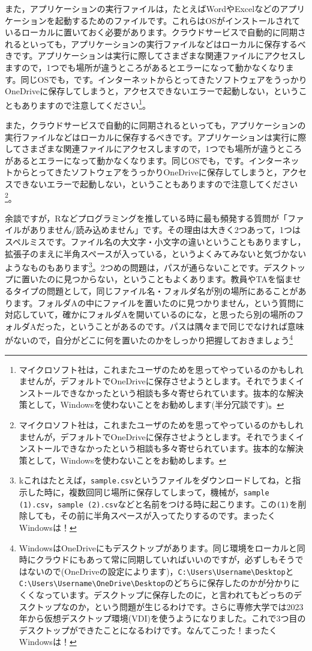 \documentclass{ltjsbook}
\begin{document}
また，アプリケーションの実行ファイルは，たとえばWordやExcelなどのアプリケーションを起動するためのファイルです。これらはOSがインストールされているローカルに置いておく必要があります。クラウドサービスで自動的に同期されるといっても，アプリケーションの実行ファイルなどはローカルに保存するべきです。アプリケーションは実行に際してさまざまな関連ファイルにアクセスしますので，1つでも場所が違うところがあるとエラーになって動かなくなります。同じOSでも，です。インターネットからとってきたソフトウェアをうっかりOneDriveに保存してしまうと，アクセスできないエラーで起動しない，ということもありますので注意してください\footnote{マイクロソフト社は，これまたユーザのためを思ってやっているのかもしれませんが，デフォルトでOneDriveに保存させようとします。それでうまくインストールできなかったという相談も多々寄せられています。抜本的な解決策として，Windowsを使わないことをお勧めします(半分冗談です)。}。

また，クラウドサービスで自動的に同期されるといっても，アプリケーションの実行ファイルなどはローカルに保存するべきです。アプリケーションは実行に際してさまざまな関連ファイルにアクセスしますので，1つでも場所が違うところがあるとエラーになって動かなくなります。同じOSでも，です。インターネットからとってきたソフトウェアをうっかりOneDriveに保存してしまうと，アクセスできないエラーで起動しない，ということもありますので注意してください\footnote{マイクロソフト社は，これまたユーザのためを思ってやっているのかもしれませんが，デフォルトでOneDriveに保存させようとします。それでうまくインストールできなかったという相談も多々寄せられています。抜本的な解決策として，Windowsを使わないことをお勧めします。}。

余談ですが，Rなどプログラミングを推している時に最も頻発する質問が「ファイルがありません/読み込めません」です。その理由は大きく2つあって，1つはスペルミスです。ファイル名の大文字・小文字の違いということもありますし，拡張子のまえに半角スペースが入っている，というよくみてみないと気づかないようなものもあります\footnote{kこれはたとえば，\verb|sample.csv|というファイルをダウンロードしてね，と指示した時に，複数回同じ場所に保存してしまって，機械が，\verb|sample (1).csv|，\verb|sample (2).csv|などと名前をつける時に起こります。この\verb|(1)|を削除しても，その前に半角スペースが入ってたりするのです。まったくWindowsは！}。2つめの問題は，パスが通らないことです。デスクトップに置いたのに見つからない，ということもよくあります。教員やTAを悩ませるタイプの問題として，同じファイル名・フォルダ名が別の場所にあることがあります。フォルダAの中にファイルを置いたのに見つかりません，という質問に対応していて，確かにフォルダAを開いているのにな，と思ったら別の場所のフォルダAだった，ということがあるのです。パスは隅々まで同じでなければ意味がないので，自分がどこに何を置いたのかをしっかり把握しておきましょう\footnote{WindowsはOneDriveにもデスクトップがあります。同じ環境をローカルと同時にクラウドにもあって常に同期していればいいのですが，必ずしもそうではないので(OneDriveの設定によります)，\verb|C:\Users\Username\Desktop|と\verb|C:\Users\Username\OneDrive\Desktop|のどちらに保存したのかが分かりにくくなっています。デスクトップに保存したのに，と言われてもどっちのデスクトップなのか，という問題が生じるわけです。さらに専修大学では2023年から仮想デスクトップ環境(VDI)を使うようになりました。これで3つ目のデスクトップができたことになるわけです。なんてこった！まったくWindowsは！}
\end{document}
